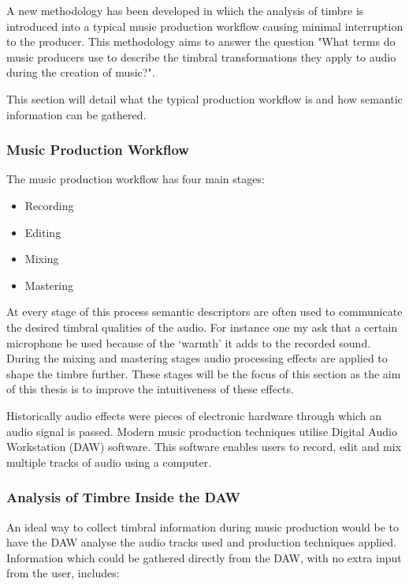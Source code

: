		A new methodology has been developed in which the analysis of timbre is introduced into a typical music
		production workflow causing minimal interruption to the producer. This methodology aims to answer the
		question "What terms do music producers use to describe the timbral transformations they apply to audio
		during the creation of music?". 
		
		This section will detail what the typical production workflow is and how semantic information can be
		gathered.

		\subsubsection{Music Production Workflow}

			The music production workflow has four main stages:

			\begin{itemize}
				\item Recording
				\item Editing
				\item Mixing
				\item Mastering
			\end{itemize}

			At every stage of this process semantic descriptors are often used to communicate the desired
			timbral qualities of the audio. For instance one my ask that a certain microphone be used because of
			the `warmth' it adds to the recorded sound. During the mixing and mastering stages audio processing
			effects are applied to shape the timbre further.  These stages will be the focus of this section as
			the aim of this thesis is to improve the intuitiveness of these effects.

			Historically audio effects were pieces of electronic hardware through which an audio signal is
			passed. Modern music production techniques utilise Digital Audio Workstation (DAW) software. This
			software enables users to record, edit and mix multiple tracks of audio using a computer. 
			
		\subsubsection{Analysis of Timbre Inside the DAW}
			An ideal way to collect timbral information during music production would be to have the DAW analyse
			the audio tracks used and production techniques applied. Information which could be gathered
			directly from the DAW, with no extra input from the user, includes:

